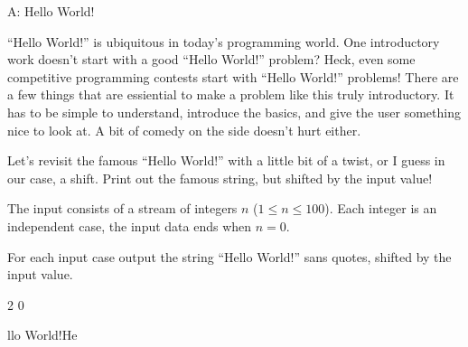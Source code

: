 \begin{problem}{A: Hello World!}

``Hello World!'' is ubiquitous in today's programming world.
One introductory work doesn't start with a good ``Hello World!'' problem?
Heck, even some competitive programming contests start with ``Hello World!'' problems!
There are a few things that are essiential to make a problem like this truly introductory.
It has to be simple to understand, introduce the basics, and give the user something nice to look at.
A bit of comedy on the side doesn't hurt either.

Let's revisit the famous ``Hello World!'' with a little bit of a twist, or I guess in our case, a shift.
Print out the famous string, but shifted by the input value!

\end{problem}

\begin{formalin}
The input consists of a stream of integers $n$ ($1 \leq n \leq 100$).
Each integer is an independent case, the input data ends when $n = 0$.
\end{formalin}

\begin{formalout}
For each input case output the string ``Hello World!'' sans quotes, shifted by the input value.
\end{formalout}

\begin{datain}
2
0
\end{datain}

\begin{dataout}
llo World!He
\end{dataout}

